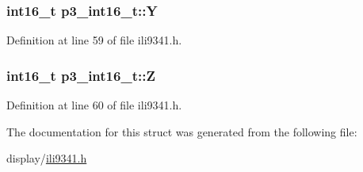 \subsubsection[{\texorpdfstring{Y}{Y}}]{\setlength{\rightskip}{0pt plus 5cm}int16\+\_\+t p3\+\_\+int16\+\_\+t\+::Y}\hypertarget{structp3__int16__t_a8bbd7ad56a3bb5399524c40527556d89}{}\label{structp3__int16__t_a8bbd7ad56a3bb5399524c40527556d89}


Definition at line 59 of file ili9341.\+h.

\subsubsection[{\texorpdfstring{Z}{Z}}]{\setlength{\rightskip}{0pt plus 5cm}int16\+\_\+t p3\+\_\+int16\+\_\+t\+::Z}\hypertarget{structp3__int16__t_a783a79cfeb34e41432b26918fd28144f}{}\label{structp3__int16__t_a783a79cfeb34e41432b26918fd28144f}


Definition at line 60 of file ili9341.\+h.



The documentation for this struct was generated from the following file\+:\begin{DoxyCompactItemize}
\item 
display/\hyperlink{ili9341_8h}{ili9341.\+h}\end{DoxyCompactItemize}
